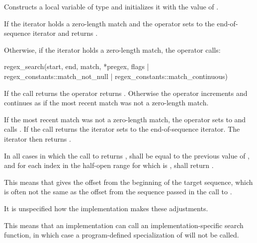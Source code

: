 \begin{itemdescr}
\pnum
\effects
Constructs a local variable  of type  and
initializes it with the value of .

\pnum
If the iterator holds a zero-length match and  the operator
sets  to the end-of-sequence iterator and returns .

\pnum
{}%
%
Otherwise, if the iterator holds a zero-length match, the operator calls:
\begin{codeblock}
regex_search(start, end, match, *pregex,
             flags | regex_constants::match_not_null | regex_constants::match_continuous)
\end{codeblock}
If the call returns  the operator
returns . Otherwise the operator increments  and continues as if
the most recent match was not a zero-length match.

\pnum
{}%
If the most recent match was not a zero-length match, the operator sets
 to  and
calls . If the call returns
 the iterator sets  to the end-of-sequence iterator. The
iterator then returns .

\pnum
In all cases in which the call to  returns ,
 shall be equal to the previous value of
, and for each index  in the half-open range
 for which  is ,
shall return .

\pnum
\begin{note}
This means that  gives the
offset from the beginning of the target sequence, which is often not
the same as the offset from the sequence passed in the call
to .
\end{note}

\pnum
It is unspecified how the implementation makes these adjustments.

\pnum
\begin{note}
This means that an implementation can call an
implementation-specific search function, in which case a program-defined
specialization of  will not be
called.
\end{note}
\end{itemdescr}

